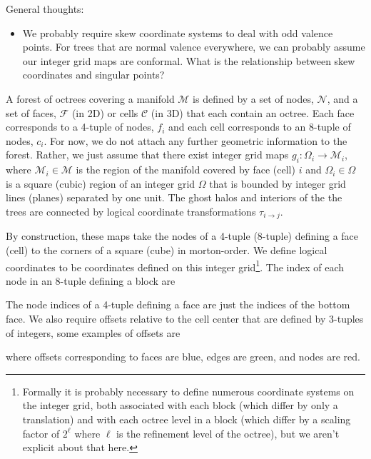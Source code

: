 \documentclass{article}
\begin{document}
General thoughts:
\begin{itemize}
    \item We probably require skew coordinate systems to deal with odd valence points. For trees that are normal valence everywhere, we can probably assume our integer grid maps are conformal. What is the relationship between skew coordinates and singular points?
\end{itemize}

A forest of octrees covering a manifold $\mathcal{M}$ is defined by a set of nodes, $\mathcal{N}$, and a set of faces, $\mathcal{F}$ (in 2D) or cells $\mathcal{C}$ (in 3D) that each contain an octree. Each face corresponds to a 4-tuple of nodes, $f_i$ and each cell corresponds to an 8-tuple of nodes, $c_i$. For now, we do not attach any further geometric information to the forest. Rather, we just assume that there exist integer grid maps $g_i: \Omega_i \rightarrow \mathcal{M}_i$, where $\mathcal{M}_i \in \mathcal{M}$ is the region of the manifold covered by face (cell) $i$ and $\Omega_i \in \Omega$ is a square (cubic) region of an integer grid $\Omega$ that is bounded by integer grid lines (planes) separated by one unit. The ghost halos and interiors of the the trees are connected by logical coordinate transformations $\tau_{i \rightarrow j}$.
\begin{center}

\end{center}


By construction, these maps take the nodes of a 4-tuple (8-tuple) defining a face (cell) to the corners of a square (cube) in morton-order. We define logical coordinates to be coordinates defined on this integer grid\footnote{Formally it is probably necessary to define numerous coordinate systems on the integer grid, both associated with each block (which differ by only a translation) and with each octree level in a block (which differ by a scaling factor of $2^\ell$ where $\ell$ is the refinement level of the octree), but we aren't explicit about that here.}. The index of each node in an 8-tuple defining a block are
\begin{center}

\end{center}
The node indices of a 4-tuple defining a face are just the indices of the bottom face. We also require offsets relative to the cell center that are defined by 3-tuples of integers, some examples of offsets are
\begin{center}

\end{center}
where offsets corresponding to faces are blue, edges are green, and nodes are red.
\end{document}
